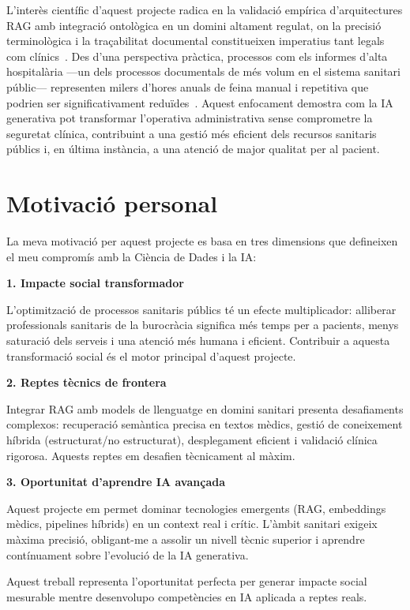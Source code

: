 \documentclass[CAT]{TFUOC}%
\begin{document}
L'interès científic d'aquest projecte radica en la validació empírica d'arquitectures RAG amb integració ontològica en un domini altament regulat, on la precisió terminològica i la traçabilitat documental constitueixen imperatius tant legals com clínics~\cite{lewis2020retrieval}. Des d'una perspectiva pràctica, processos com els informes d'alta hospitalària ---un dels processos documentals de més volum en el sistema sanitari públic--- representen milers d'hores anuals de feina manual i repetitiva que podrien ser significativament reduïdes~\cite{sinsky2016allocation}. Aquest enfocament demostra com la IA generativa pot transformar l'operativa administrativa sense comprometre la seguretat clínica, contribuint a una gestió més eficient dels recursos sanitaris públics i, en última instància, a una atenció de major qualitat per al pacient.

\section{Motivació personal}

La meva motivació per aquest projecte es basa en tres dimensions que defineixen el meu compromís amb la Ciència de Dades i la IA:

\textbf{1. Impacte social transformador}

L'optimització de processos sanitaris públics té un efecte multiplicador: alliberar professionals sanitaris de la burocràcia significa més temps per a pacients, menys saturació dels serveis i una atenció més humana i eficient. Contribuir a aquesta transformació social és el motor principal d'aquest projecte.

\textbf{2. Reptes tècnics de frontera}

Integrar RAG amb models de llenguatge en domini sanitari presenta desafiaments complexos: recuperació semàntica precisa en textos mèdics, gestió de coneixement híbrida (estructurat/no estructurat), desplegament eficient i validació clínica rigorosa. Aquests reptes em desafien tècnicament al màxim.

\textbf{3. Oportunitat d'aprendre IA avançada}

Aquest projecte em permet dominar tecnologies emergents (RAG, embeddings mèdics, pipelines híbrids) en un context real i crític. L'àmbit sanitari exigeix màxima precisió, obligant-me a assolir un nivell tècnic superior i aprendre contínuament sobre l'evolució de la IA generativa.

Aquest treball representa l'oportunitat perfecta per generar impacte social mesurable mentre desenvolupo competències en IA aplicada a reptes reals.
\end{document}
